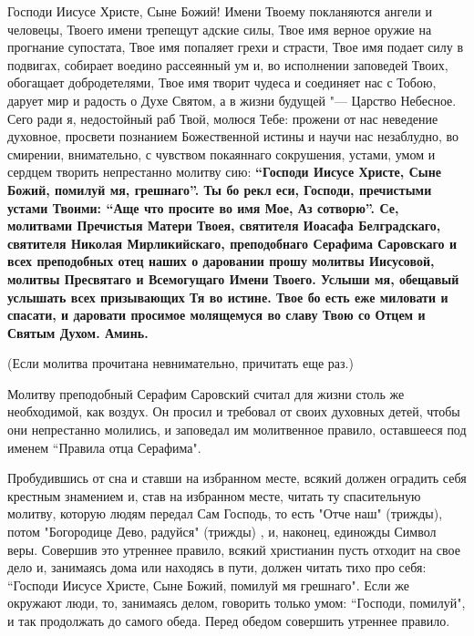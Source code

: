 \mychapterending

 





Господи Иисусе Христе, Сыне Божий! Имени Твоему покланяются ангели и человецы, Твоего имени трепещут адские силы, Твое имя верное оружие на прогнание супостата, Твое имя попаляет грехи и страсти, Твое имя подает силу в подвигах, собирает воедино рассеянный ум и, во исполнении заповедей Твоих, обогащает добродетелями, Твое имя творит чудеса и соединяет нас с Тобою, дарует мир и радость о Духе Святом, а в жизни будущей "--- Царство Небесное. Сего ради я, недостойный раб Твой, молюся Тебе: прожени от нас неведение духовное, просвети познанием Божественной истины и научи нас незаблудно, во смирении, внимательно, с чувством покаяннаго сокрушения, устами, умом и сердцем творить непрестанно молитву сию: \bfseries “Господи Иисусе Христе, Сыне Божий, помилуй мя, грешнаг\normalfont{}о”. Ты бо рекл еси, Господи, пречистыми устами Твоими: “Аще что просите во имя Мое, Аз сотворю”. Се, молитвами Пречистыя Матери Твоея, святителя Иоасафа Белградскаго, святителя Николая Мирликийскаго, преподобнаго Серафима Саровскаго и всех преподобных отец наших о даровании прошу молитвы Иисусовой,  молитвы  Пресвятаго и Всемогущаго Имени Твоего. Услыши мя, обещавый услышать всех призывающих Тя во истине. Твое бо есть еже миловати и спасати, и даровати просимое молящемуся во славу Твою со Отцем и Святым Духом. Аминь. 






\itshape 


(Если молитва прочитана невнимательно, причитать еще раз.)

\normalfont{}


\mychapterending

 





Молитву преподобный Серафим Саровский считал для жизни столь же необходимой, как  воздух. Он просил и требовал от своих духовных детей, чтобы они непрестанно молились, и заповедал им молитвенное правило, оставшееся под именем “Правила отца Серафима". 

Пробудившись от сна и ставши на избранном месте, всякий должен оградить себя крестным знамением и, став на избранном месте, читать ту спасительную молитву, которую людям передал Сам Господь, то есть "Отче наш" (трижды), потом "Богородице Дево, радуйся" (трижды) , и, наконец, единожды Символ веры. Совершив это утреннее правило, всякий христианин пусть отходит на свое дело и, занимаясь дома или находясь в пути, должен читать тихо про себя: “Господи Иисусе Христе, Сыне Божий, помилуй мя грешнаго". Если же окружают люди, то, занимаясь делом, говорить только умом: “Господи, помилуй", и так продолжать до самого обеда. Перед обедом совершить утреннее правило. 

